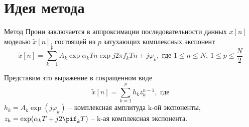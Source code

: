 \documentclass[a4paper,14pt]{extarticle}
\renewcommand*{\phi}{\varphi}
\begin{document}




        



\section{Идея метода}%
\label{sec:ideia_metoda}


Метод Прони заключается в аппроксимации последовательности данных $x[n]$
моделью $\tilde x[n]$,
состоящей из $p$ затухающих комплексных экспонент
\begin{equation}
    \tilde x[n] = \sum\limits_{k=1}^{p} A_k\exp{\alpha_k Tn} \exp{j2\pi f_k Tn
    +j\phi_k}, \text{ где } 1\leq n\leq N,~ 1\leq p \leq \frac{N}{2}
\end{equation}

Представим это выражение в cокращенном виде
\begin{equation}
    \label{eq:}
    \tilde x[n] = \sum\limits_{k=1}^{p} h_k z_{k}^{n-1}, \text{ где}
\end{equation}
    $h_k = A_k \exp(j \phi_k)$ -- комплексная амплитуда k-ой экспоненты,
    $z_k= \exp(\alpha_kT + j 2\pif_kT)$ -- k-ая комплексная экспонента. 
\end{document}
